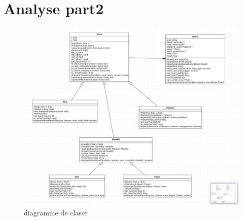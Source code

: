 \newpage
\section{Analyse part2}
\begin{figure}[h]
	\centering
	\includegraphics[width=\textwidth] {pictures/uml.png}
	\caption{diagramme de classe}
	\label{fig:UML}
\end{figure}

